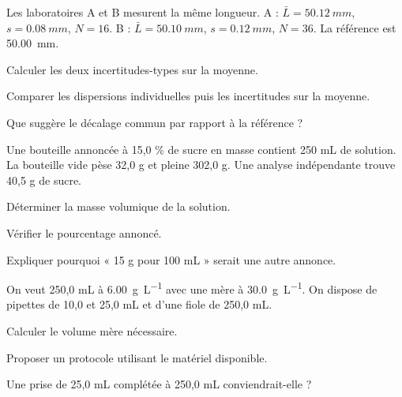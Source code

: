 \label{defi-ex-1-1}\label{defis-debut}
Les laboratoires A et B mesurent la même longueur. A : $\bar L=\qty{50,12}{mm}$, $s=\qty{0,08}{mm}$, $N=16$. B : $\bar L=\qty{50,10}{mm}$, $s=\qty{0,12}{mm}$, $N=36$. La référence est \qty{50,00}{mm}.
\begin{questions}
\item Calculer les deux incertitudes-types sur la moyenne.
\item Comparer les dispersions individuelles puis les incertitudes sur la moyenne.
\item Que suggère le décalage commun par rapport à la référence ?
\end{questions}
\smallskip{}\hfill{}

\label{defi-ex-2-1}
Une bouteille annoncée à 15,0 \% de sucre en masse contient 250 mL de solution. La bouteille vide pèse 32,0 g et pleine 302,0 g. Une analyse indépendante trouve 40,5 g de sucre.
\begin{questions}
\item Déterminer la masse volumique de la solution.
\item Vérifier le pourcentage annoncé.
\item Expliquer pourquoi « 15 g pour 100 mL » serait une autre annonce.
\end{questions}
\smallskip{}\hfill{}

\label{defi-ex-3-1}
On veut 250,0 mL à \qty{6,00}{g.L^{-1}} avec une mère à \qty{30,0}{g.L^{-1}}. On dispose de pipettes de 10,0 et 25,0 mL et d’une fiole de 250,0 mL.
\begin{questions}
\item Calculer le volume mère nécessaire.
\item Proposer un protocole utilisant le matériel disponible.
\item Une prise de 25,0 mL complétée à 250,0 mL conviendrait-elle ?
\end{questions}
\smallskip{}\hfill{}

